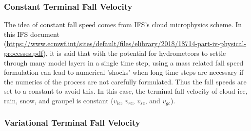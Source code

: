 \documentclass[letterpaper,titlepage,10pt]{article}
\numberwithin{equation}{section}
\begin{document}

\subsubsection*{Constant Terminal Fall Velocity}

The idea of constant fall speed comes from IFS's cloud microphysics scheme. In this IFS document (\url{https://www.ecmwf.int/sites/default/files/elibrary/2018/18714-part-iv-physical-processes.pdf}), it is said that with the potential for hydrometeors to settle through many model layers in a single time step, using a mass related fall speed formulation can lead to numerical 'shocks' when long time steps are necessary if the numerics of the process are not carefully formulated. Thus the fall speeds are set to a constant to avoid this. In this case, the terminal fall velocity of cloud ice, rain, snow, and graupel is constant ($v_{ic}$, $v_{rc}$, $v_{sc}$, and $v_{gc}$).


\subsubsection*{Variational Terminal Fall Velocity}
\end{document}

